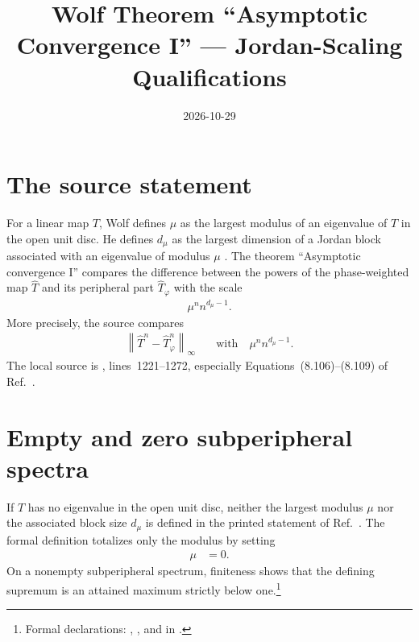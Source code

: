 \documentclass{article}
\title{Wolf Theorem ``Asymptotic Convergence I'' --- Jordan-Scaling Qualifications}
\author{}
\date{2026-10-29}
\begin{document}
\maketitle
{}

\section{The source statement}

For a linear map $T$, Wolf defines $\mu$ as the largest modulus of an
eigenvalue of $T$ in the open unit disc. He defines $d_\mu$ as the largest
dimension of a Jordan block associated with an eigenvalue of modulus $\mu$
\cite[Chapter~8, lines~1221--1272]{Wolf2012Quantum}. The theorem
``Asymptotic convergence I'' compares the difference between the powers of the
phase-weighted map $\widehat T$ and its peripheral part
$\widehat T_\varphi$ with the scale
\begin{align}
    \mu^n n^{d_\mu-1}.
    \label{eq:wolf_thm823_jordan_scaling_qualifications_asymptotic_scale}
\end{align}
More precisely, the source compares
\begin{align}
    \left\lVert \widehat T^n-\widehat T_\varphi^n\right\rVert_\infty
        &\quad\text{with}\quad
        \mu^n n^{d_\mu-1}.
    \label{eq:wolf_thm823_jordan_scaling_qualifications_source_comparison}
\end{align}
The local source is
,
lines~1221--1272, especially Equations~(8.106)--(8.109) of
Ref.~\cite{Wolf2012Quantum}.

\section{Empty and zero subperipheral spectra}

If $T$ has no eigenvalue in the open unit disc, neither the largest modulus
$\mu$ nor the associated block size $d_\mu$ is defined in the printed
statement of Ref.~\cite{Wolf2012Quantum}. The formal definition totalizes only
the modulus by setting
\begin{align}
    \mu
        &= 0.
    \label{eq:wolf_thm823_jordan_scaling_qualifications_empty_modulus}
\end{align}
On a nonempty subperipheral spectrum, finiteness shows that the defining
supremum is an attained maximum strictly below one.\footnote{Formal
declarations:
,
, and
 in
.}
\end{document}
